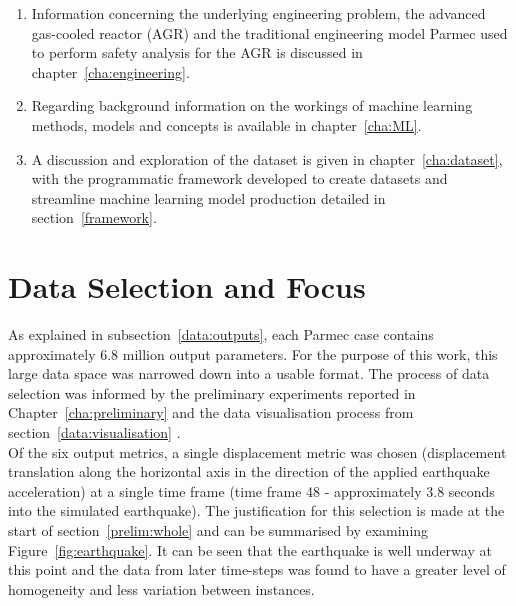 \begin{enumerate}
	
	\item Information concerning the underlying engineering problem, the advanced gas-cooled reactor (AGR) and the traditional engineering model Parmec used to perform safety analysis for the AGR is discussed in chapter~\ref{cha:engineering}.
	
	\item Regarding background information on the workings of machine learning methods, models and concepts is available in chapter~\ref{cha:ML}.
	
	\item A discussion and exploration of the dataset is given in chapter~\ref{cha:dataset}, with the programmatic framework developed to create datasets and streamline machine learning model production detailed in section~\ref{framework}.
	
	
	
\end{enumerate}

\section{Data Selection and Focus} \label{data_selection}

As explained in subsection~\ref{data:outputs}, each Parmec case contains approximately 6.8 million output parameters. For the purpose of this work,  this large data space was narrowed down into a usable format. The process of data selection was informed by the preliminary experiments reported in Chapter~\ref{cha:preliminary} and the data visualisation process from section~\ref{data:visualisation} .  
\\

\noindent
Of the six output metrics, a single displacement metric was chosen (displacement translation along the horizontal axis in the direction of the applied earthquake acceleration) at a single time frame (time frame 48 - approximately 3.8 seconds into the simulated earthquake). The justification for this selection is made at the start of section~\ref{prelim:whole} and can be summarised by examining Figure~\ref{fig:earthquake}. It can be seen that the earthquake is well underway at this point and the data from later time-steps was found to have a greater level of homogeneity and less variation between instances.
\\

